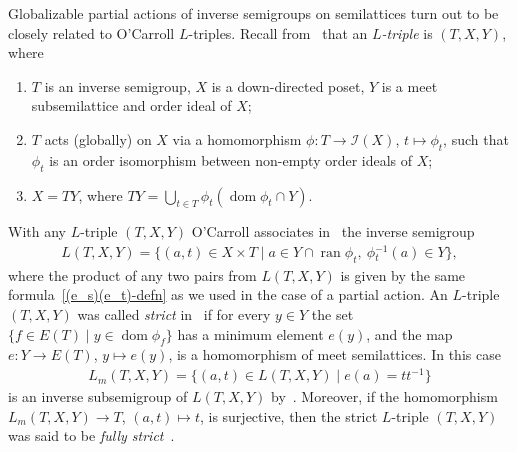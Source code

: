 \documentclass[reqno]{amsart}
\theoremstyle{definition}
\newcommand{\cI}[1]{\mathcal I{(#1)}}
\newcommand{\dom}[1]{\operatorname{\mathrm{dom}}{#1}}
\newcommand{\ran}[1]{\operatorname{\mathrm{ran}}{#1}}
\newcommand{\m}{{}^{-1}}
\newcommand{\0}{\theta}
\begin{document}
Globalizable partial actions of inverse semigroups on semilattices turn out to be closely related to O'Carroll $L$-triples. Recall from~\cite{O'Carroll77} that an \emph{$L$-triple} is $(T,X,Y)$, where 
\begin{enumerate}
	\item $T$ is an inverse semigroup, $X$ is a down-directed poset, $Y$ is a meet subsemilattice and order ideal of $X$;
	\item $T$ acts (globally) on $X$ via a homomorphism $\phi:T\to\cI X$, $t\mapsto\phi_t$, such that $\phi_t$ is an order isomorphism between	non-empty order ideals of $X$;
	\item $X=TY$, where $TY=\bigcup_{t\in T}\phi_t(\dom{\phi_t}\cap Y)$.
\end{enumerate}
With any $L$-triple $(T,X,Y)$ O'Carroll associates in~\cite{O'Carroll77} the inverse semigroup
\begin{align}\label{L(T_X_Y)-defn}
L(T,X,Y)=\{(a,t)\in X\times T\mid a\in Y\cap\ran{\phi_t},\ \phi\m_t(a)\in Y\},
\end{align}
where the product of any two pairs from $L(T,X,Y)$ is given by the same formula~\eqref{(e_s)(e_t)-defn} as we used in the case of a partial action. An $L$-triple $(T,X,Y)$ was called \emph{strict} in~\cite{O'Carroll77} if for every $y\in Y$ the set $\{f\in E(T)\mid y\in\dom{\phi_f}\}$ has a minimum element $e(y)$, and the map $e:Y\to E(T)$, $y\mapsto e(y)$, is a homomorphism of meet semilattices. In this case 
\begin{align*}
L_m(T,X,Y)=\{(a,t)\in L(T,X,Y)\mid e(a)=tt\m\}
\end{align*}
is an inverse subsemigroup of $L(T,X,Y)$ by~\cite[Theorem~2]{O'Carroll77}. Moreover, if the homomorphism $L_m(T,X,Y)\to T$, $(a,t)\mapsto t$, is surjective, then the strict $L$-triple $(T,X,Y)$ was said to be \emph{fully strict}~\cite{O'Carroll77}.
\end{document}

